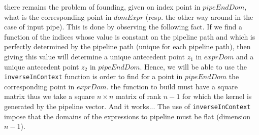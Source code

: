 \documentclass[a4paper,11pt]{article}
\begin{document}
there remains the problem of founding, given on index point in
$pipeEndDom$, what is the corresponding point in $domExpr$ (resp. the
other way around in the case of input pipe). This is done by
observing the following fact. If we find a function of the indices
whose value is constant on the pipeline path and which is perfectly
determined by the pipeline path (unique for each pipeline path),
then giving this value will determine a unique antecedent point
$z_1$ in $exprDom$ and a unique antecedent point $z_2$ in
$pipeEndDom$. Hence, we will be able to use the {\tt
inverseInContext} function is order to find for a point in
$pipeEndDom$ the corresponding point in $exprDom$. the function to
build must have a square matrix thus we take a square $n\times n$
matrix of rank $n-1$ for which the kernel is generated by the
pipeline vector. And it works...  The use of {\tt inverseInContext}
impose that the domains of the expressions to pipeline must be flat
(dimension $n-1$).
\end{document}

